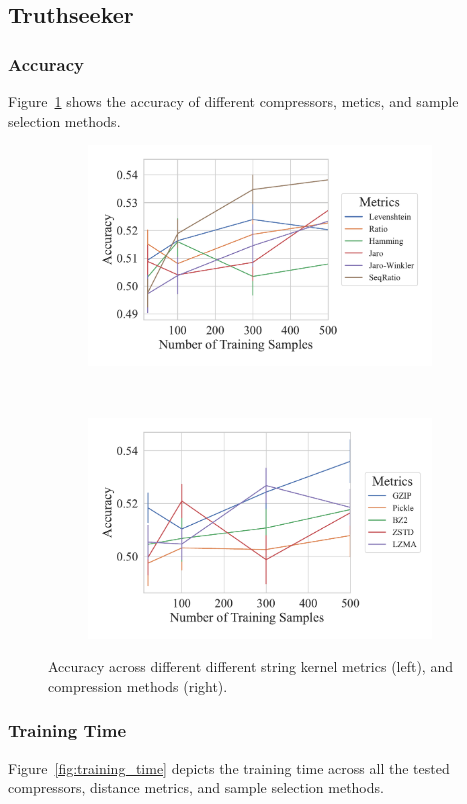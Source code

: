 \subsection{Truthseeker}

\subsubsection{Accuracy}
Figure~\ref{fig:accuracy} shows the accuracy of different compressors, metics, and sample selection methods.

\begin{figure}
	\begin{subfigure}
		\centering
		\includegraphics[width=.46\textwidth]{figs/truthseeker/string_metric_vs_accuracy.pdf}
	\end{subfigure}
	~
	\begin{subfigure}
		\centering
		\includegraphics[width=.46\textwidth]{figs/truthseeker/compressor_metric_vs_accuracy.pdf}
	\end{subfigure}
	\caption{Accuracy across different different string kernel metrics (left), and compression methods (right).}
	\label{fig:accuracy}
\end{figure}

\subsubsection{Training Time}

Figure~\ref{fig:training_time} depicts the training time across all the tested compressors, distance metrics, and sample selection methods.

